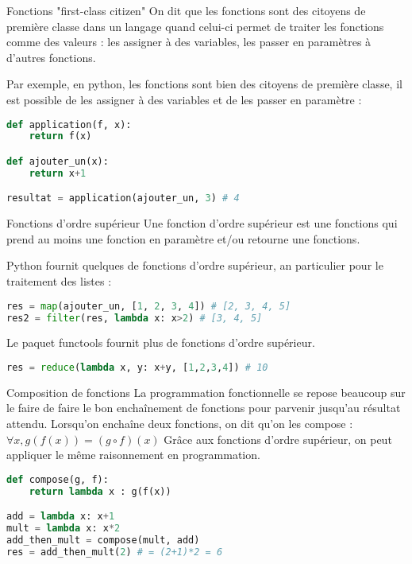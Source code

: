 \documentclass[aspectratio=169]{beamer}
\begin{document}
\begin{frame}[fragile]{Fonctions "first-class citizen"}
    On dit que les fonctions sont des citoyens de première classe dans un langage quand celui-ci permet de traiter les fonctions comme des valeurs : les assigner à des variables, les passer en paramètres à d'autres fonctions.

    Par exemple, en python, les fonctions sont bien des citoyens de première classe, il est possible de les assigner à des variables et de les passer en paramètre :

    \begin{lstlisting}[language=Python]
def application(f, x):
    return f(x)

def ajouter_un(x):
    return x+1

resultat = application(ajouter_un, 3) # 4
    \end{lstlisting}
\end{frame}

\begin{frame}[fragile]{Fonctions d'ordre supérieur}
    Une fonction d'ordre supérieur est une fonctions qui prend au moins une fonction en paramètre et/ou retourne une fonctions.

    Python fournit quelques de fonctions d'ordre supérieur, an particulier pour le traitement des listes :

    \begin{lstlisting}[language=Python]
res = map(ajouter_un, [1, 2, 3, 4]) # [2, 3, 4, 5]
res2 = filter(res, lambda x: x>2) # [3, 4, 5]
    \end{lstlisting}

    Le paquet functools fournit plus de fonctions d'ordre supérieur.

      \begin{lstlisting}[language=Python]
res = reduce(lambda x, y: x+y, [1,2,3,4]) # 10
    \end{lstlisting}  
\end{frame}

\begin{frame}[fragile]{Composition de fonctions}
    La programmation fonctionnelle se repose beaucoup sur le faire de faire le bon enchaînement de fonctions pour parvenir jusqu'au résultat attendu. Lorsqu'on enchaîne deux fonctions, on dit qu'on les compose : $\forall x, g(f(x)) = (g\circ f)(x)$
    Grâce aux fonctions d'ordre supérieur, on peut appliquer le même raisonnement en programmation.

    \pause
    \begin{lstlisting}[language=Python]
def compose(g, f):
    return lambda x : g(f(x))

add = lambda x: x+1
mult = lambda x: x*2
add_then_mult = compose(mult, add)
res = add_then_mult(2) # = (2+1)*2 = 6
    \end{lstlisting}
\end{frame}
\end{document}

